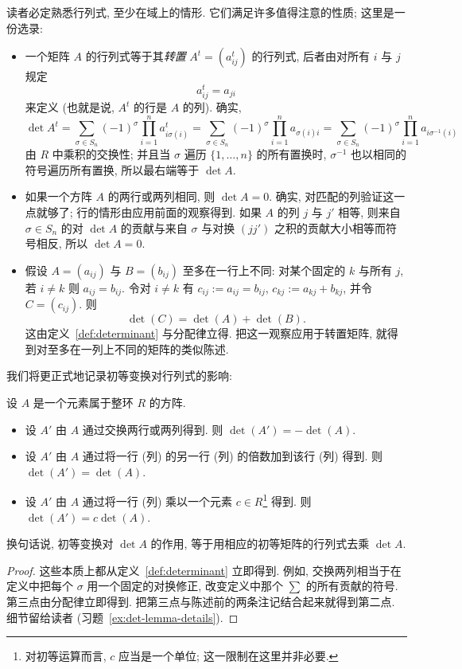 读者必定熟悉行列式, 至少在域上的情形. 它们满足许多值得注意的性质; 这里是一份选录:
\begin{itemize}
\item 一个矩阵 $A$ 的行列式等于其\emph{转置} $A^t=(a_{ij}^t)$ 的行列式, 后者由对所有 $i$ 与 $j$ 规定
\[
a_{ij}^t=a_{ji}
\]
来定义 (也就是说, $A^t$ 的行是 $A$ 的列). 确实,
\[
\det A^t=\sum_{\sigma\in S_n}(-1)^\sigma\prod_{i=1}^n a_{i\sigma(i)}^t=\sum_{\sigma\in S_n}(-1)^\sigma\prod_{i=1}^n a_{\sigma(i)i}=\sum_{\sigma\in S_n}(-1)^\sigma\prod_{i=1}^n a_{i\sigma^{-1}(i)}
\]
由 $R$ 中乘积的交换性; 并且当 $\sigma$ 遍历 $\{1,\ldots,n\}$ 的所有置换时, $\sigma^{-1}$ 也以相同的符号遍历所有置换, 所以最右端等于 $\det A$.
\item 如果一个方阵 $A$ 的两行或两列相同, 则 $\det A=0$. 确实, 对匹配的列验证这一点就够了; 行的情形由应用前面的观察得到. 如果 $A$ 的列 $j$ 与 $j'$ 相等, 则来自 $\sigma\in S_n$ 的对 $\det A$ 的贡献与来自 $\sigma$ 与对换 $(jj')$ 之积的贡献大小相等而符号相反, 所以 $\det A=0$.
\item 假设 $A=(a_{ij})$ 与 $B=(b_{ij})$ 至多在一行上不同: 对某个固定的 $k$ 与所有 $j$, 若 $i\neq k$ 则 $a_{ij}=b_{ij}$. 令对 $i\neq k$ 有 $c_{ij}:=a_{ij}=b_{ij}$, $c_{kj}:=a_{kj}+b_{kj}$, 并令 $C=(c_{ij})$. 则
\[
\det(C)=\det(A)+\det(B).
\]
这由定义~\ref{def:determinant} 与分配律立得. 把这一观察应用于转置矩阵, 就得到对至多在一列上不同的矩阵的类似陈述.
\end{itemize}

我们将更正式地记录初等变换对行列式的影响:

\begin{lemma}\label{lem:det-elementary-ops}
设 $A$ 是一个元素属于整环 $R$ 的方阵.
\begin{itemize}
\item 设 $A'$ 由 $A$ 通过交换两行或两列得到. 则 $\det(A')=-\det(A)$.
\item 设 $A'$ 由 $A$ 通过将一行 (列) 的另一行 (列) 的倍数加到该行 (列) 得到. 则 $\det(A')=\det(A)$.
\item 设 $A'$ 由 $A$ 通过将一行 (列) 乘以一个元素 $c\in R$\footnote{对初等运算而言, $c$ 应当是一个单位; 这一限制在这里并非必要.} 得到. 则 $\det(A')=c\det(A)$.
\end{itemize}
换句话说, 初等变换对 $\det A$ 的作用, 等于用相应的初等矩阵的行列式去乘 $\det A$.
\end{lemma}

\begin{proof}
这些本质上都从定义~\ref{def:determinant} 立即得到. 例如, 交换两列相当于在定义中把每个 $\sigma$ 用一个固定的对换修正, 改变定义中那个 $\sum$ 的所有贡献的符号. 第三点由分配律立即得到. 把第三点与陈述前的两条注记结合起来就得到第二点. 细节留给读者 (习题~\ref{ex:det-lemma-details}).
\end{proof}

